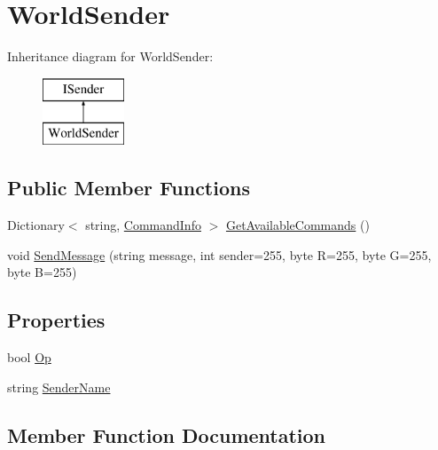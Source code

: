 \hypertarget{classOTA_1_1Command_1_1WorldSender}{}\section{World\+Sender}
\label{classOTA_1_1Command_1_1WorldSender}
Inheritance diagram for World\+Sender\+:\begin{figure}[H]
\begin{center}
\leavevmode
\includegraphics[height=2.000000cm]{classOTA_1_1Command_1_1WorldSender}
\end{center}
\end{figure}
\subsection*{Public Member Functions}
\begin{DoxyCompactItemize}
\item 
Dictionary$<$ string, \hyperlink{classOTA_1_1Command_1_1CommandInfo}{Command\+Info} $>$ \hyperlink{classOTA_1_1Command_1_1WorldSender_a815cfd7f711a32a0f3c4c8b129d08c01}{Get\+Available\+Commands} ()
\item 
void \hyperlink{classOTA_1_1Command_1_1WorldSender_a061eb30c76097e9fec57819bbe379599}{Send\+Message} (string message, int sender=255, byte R=255, byte G=255, byte B=255)
\end{DoxyCompactItemize}
\subsection*{Properties}
\begin{DoxyCompactItemize}
\item 
bool \hyperlink{classOTA_1_1Command_1_1WorldSender_a21ba9f1622dc7475d067844accea3cf6}{Op}
\item 
string \hyperlink{classOTA_1_1Command_1_1WorldSender_a8435cbd7a4dda595164d4ff47d4f4525}{Sender\+Name}
\end{DoxyCompactItemize}


\subsection{Member Function Documentation}
\hypertarget{classOTA_1_1Command_1_1WorldSender_a815cfd7f711a32a0f3c4c8b129d08c01}{}
